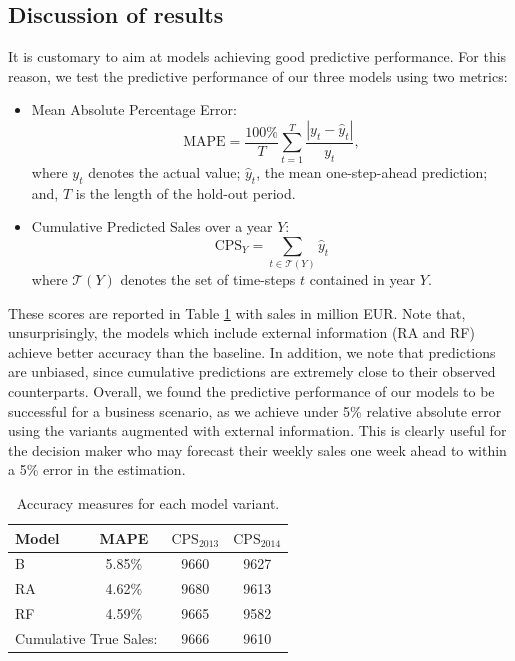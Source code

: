 


\subsection{Discussion of results}

It is customary to aim at models achieving good predictive performance. %
For this reason, we test the predictive performance of our three models using two metrics:

\begin{itemize}
\item Mean Absolute Percentage Error: $$ \text{MAPE} = \frac{100\%}{T}\sum_{t=1}^T \frac{|y_t - \hat{y}_t|}{y_t},$$
where $y_t$ denotes the actual value; $\hat{y}_t$, the mean one-step-ahead prediction; and, $T$ is the length of the hold-out period.
\item Cumulative Predicted Sales over a year $Y$:
$$
\text{CPS}_{Y} = \sum_{t \in \mathcal{T}(Y)} \hat{y}_t
$$
where $\mathcal{T}(Y)$ denotes the set of time-steps $t$ contained in year $Y$.
\end{itemize}
These scores are reported in Table \ref{tab:mapes} with sales in million EUR. Note that, unsurprisingly, the models which include external information (RA and RF) achieve better accuracy than the baseline. In addition, we note that predictions are unbiased, since cumulative predictions are extremely close to their observed counterparts. Overall, we found the predictive performance of our models to be successful for a business scenario, as we achieve under 5\% relative absolute error using the variants augmented with external information. This is clearly useful for the decision maker who may forecast their weekly sales one week ahead to within a 5\% error in the estimation.

\begin{table}[h]
\centering
\begin{tabular}{|l|c|c|c|}
\hline
Model & MAPE & $\text{CPS}_{2013}$ & $\text{CPS}_{2014}$ \\
\hline
B &  5.85\% &   9660 & 9627 \\
RA &  4.62\% &  9680 & 9613 \\
RF &  4.59\% &  9665 & 9582 \\
\hline
\multicolumn{2}{|c|}{Cumulative True Sales:} & 9666 & 9610 \\
\hline
\end{tabular}
\caption{Accuracy measures for each model variant.} \label{tab:mapes}
\end{table}

